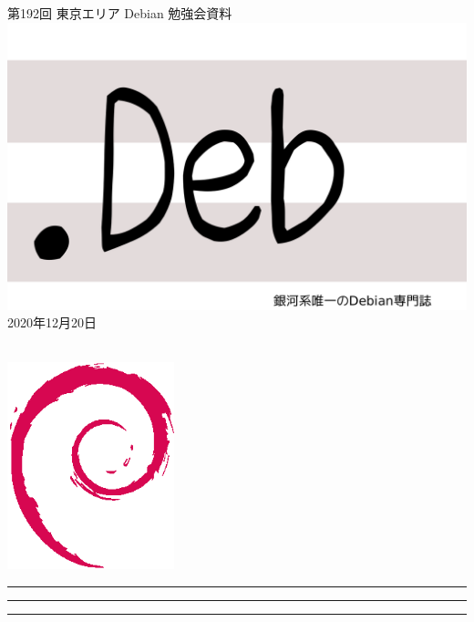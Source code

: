 \documentclass[mingoth,a4paper]{jsarticle}
\newcommand{\debmtgyear}{2020}
\newcommand{\debmtgmonth}{12}
\newcommand{\debmtgdate}{20}
\newcommand{\debmtgnumber}{192}  %
\begin{document}
\begin{titlepage}
\thispagestyle{empty}

\vspace*{-2cm}
第\debmtgnumber{}回 東京エリア Debian 勉強会資料\\
\hspace*{-2cm}
\includegraphics{image2012-natsu/dotdeb.pdf}\\
\hfill{}\debmtgyear{}年\debmtgmonth{}月\debmtgdate{}日

\\

\vspace*{-2cm}
\hfill{}\includegraphics[height=6cm]{image200502/openlogo-nd.eps}
\end{titlepage}

\newpage

\begin{minipage}[b]{0.2\hsize}
 \colorbox{titleback}{}
\end{minipage}
\begin{minipage}[b]{0.8\hsize}
\hrule
\vspace{2mm}
\hrule
\begin{multicols}{2}
\tableofcontents
\end{multicols}
\vspace{2mm}
\hrule
\end{minipage}
\end{document}
